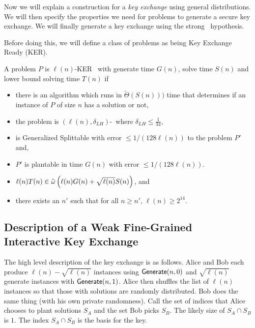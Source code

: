 

Now we will explain a construction for a \emph{key exchange} using general distributions. We will then specify the properties we need for problems to generate a secure key exchange. We will finally generate a key exchange using the strong \zkclique~hypothesis.

\newcommand{\keyER}{KER}

Before doing this, we will define a class of problems as being Key Exchange Ready (KER).

\begin{definition}
	A problem $P$ is $\ell(n)$-\keyER~ with generate time $G(n)$, solve time $S(n)$ and lower bound solving time $T(n)$ if
	\begin{itemize}
		\item there is an algorithm which runs in $\tilde\Theta(S(n)))$ time that determines if an instance of $P$ of size $n$ has a solution or not,
		\item the problem is $(\ell(n), \delta_{LH})$-\ACLH~where $\delta_{LH} \le \frac 1 {34}$,
		\item is Generalized Splittable with error $\leq 1/(128 \ell(n))$ to the problem $P'$ and,
		\item $P'$ is plantable in time $G(n)$ with error $\leq 1/(128 \ell(n))$.
		\item $\ell(n)T(n) \in \~ \omega\left(\ell(n)G(n) + \sqrt{\ell(n)}S(n)\right)$, and
		\item there exists an $n'$ such that for all $n \ge n'$, $\ell(n) \ge 2^{14}$.
	\end{itemize}
\end{definition}

\subsection{Description of a Weak Fine-Grained Interactive Key Exchange}

The high level description of the key exchange is as follows. Alice and Bob each produce $\ell(n) - \sqrt{\ell(n)}$ instances using $\Generate(n,0)$ and $\sqrt{\ell(n)}$ generate instances with $\Generate(n,1)$. Alice then shuffles the list of $\ell(n)$ instances so that those with solutions are randomly distributed. Bob does the same thing (with his own private randomness). Call the set of indices that Alice chooses to plant solutions $S_A$ and the set Bob picks $S_B$. The likely size of $S_A \cap S_B$ is $1$. The index $S_A \cap S_B$ is the basis for the key.

